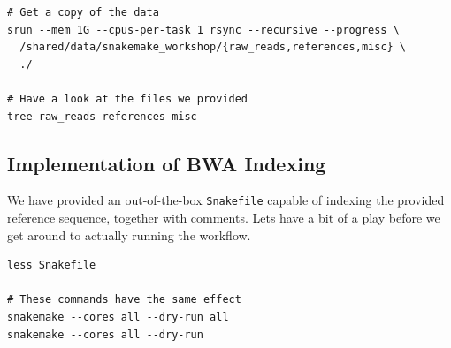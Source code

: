 \begin{lstlisting}
# Get a copy of the data
srun --mem 1G --cpus-per-task 1 rsync --recursive --progress \
  /shared/data/snakemake_workshop/{raw_reads,references,misc} \
  ./

# Have a look at the files we provided
tree raw_reads references misc
\end{lstlisting}

\subsection{Implementation of BWA Indexing}

We have provided an out-of-the-box \texttt{Snakefile} capable of indexing the provided reference sequence, together with comments.
Lets have a bit of a play before we get around to actually running the workflow.

\begin{lstlisting}
less Snakefile

# These commands have the same effect
snakemake --cores all --dry-run all
snakemake --cores all --dry-run
\end{lstlisting}


